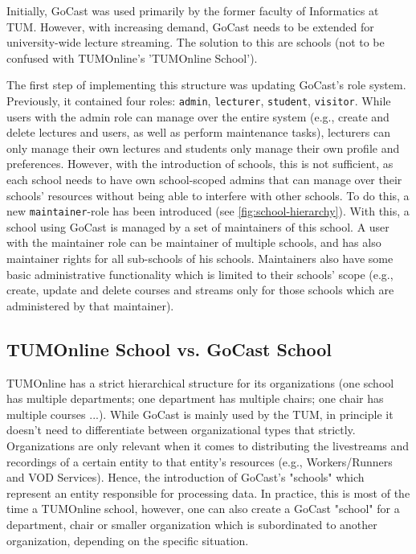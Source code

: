 Initially, GoCast was used primarily by the former faculty of Informatics at TUM. However, with increasing demand, GoCast needs to be extended for university-wide lecture streaming. The solution to this are schools (not to be confused with TUMOnline's 'TUMOnline School').

The first step of implementing this structure was updating GoCast's role system. Previously, it contained four roles: \texttt{admin}, \texttt{lecturer}, \texttt{student}, \texttt{visitor}. While users with the admin role can manage over the entire system (e.g., create and delete lectures and users, as well as perform maintenance tasks), lecturers can only manage their own lectures and students only manage their own profile and preferences. However, with the introduction of schools, this is not sufficient, as each school needs to have own school-scoped admins that can manage over their schools' resources without being able to interfere with other schools. To do this, a new \texttt{maintainer}-role has been introduced (see \autoref{fig:school-hierarchy}).
With this, a school using GoCast is managed by a set of maintainers of this school. A user with the maintainer role can be maintainer of multiple schools, and has also maintainer rights for all sub-schools of his schools.  
Maintainers also have some basic administrative functionality which is limited to their schools' scope (e.g., create, update and delete courses and streams only for those schools which are administered by that maintainer). 

\subsection{TUMOnline School vs. GoCast School}

TUMOnline has a strict hierarchical structure for its organizations (one school has multiple departments; one department has multiple chairs; one chair has multiple courses ...).
%
While GoCast is mainly used by the TUM, in principle it doesn't need to differentiate between organizational types that strictly. Organizations are only relevant when it comes to distributing the livestreams and recordings of a certain entity to that entity's resources (e.g., Workers/Runners and VOD Services). Hence, the introduction of GoCast's "schools" which represent an entity responsible for processing data. In practice, this is most of the time a TUMOnline school, however, one can also create a GoCast "school" for a department, chair or smaller organization which is subordinated to another organization, depending on the specific situation.

